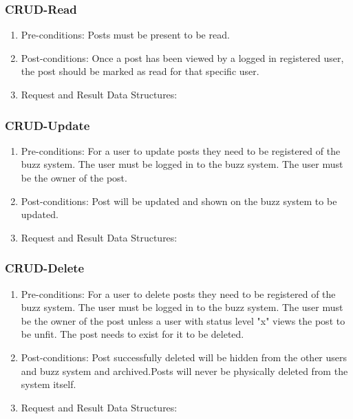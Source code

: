 \documentclass[12pt, oneside]{book}
\begin{document}
\subsubsection{CRUD-Read}
\begin{enumerate}
 \item Pre-conditions: Posts must be present to be read.
 \\
 \item Post-conditions: Once a post has been viewed by a logged in registered user, the post should be marked as read for that specific user.
  \\
 \item Request and Result Data Structures:
\end{enumerate}

\subsubsection{CRUD-Update}
\begin{enumerate}
 \item Pre-conditions:  For a user to update posts they need to be registered of the buzz system. The user must be logged in to the buzz system. The user must be the owner of the post.
 \\
 \item Post-conditions: Post will be updated and shown on the buzz system to be updated.
   \\
 \item Request and Result Data Structures:
\end{enumerate}

\subsubsection{CRUD-Delete}
\begin{enumerate}
 \item Pre-conditions:  For a user to delete posts they need to be registered of the buzz system. The user must be logged in to the buzz system. The user must be the owner of the post unless a user with status level "x" views the post to be unfit. The post needs to exist for it to be deleted.
 \\
 \item Post-conditions: Post successfully deleted will be hidden from the other users and buzz system and archived.Posts will never be physically deleted from the system itself.
   \\
 \item Request and Result Data Structures:
\end{enumerate}
\end{document}

